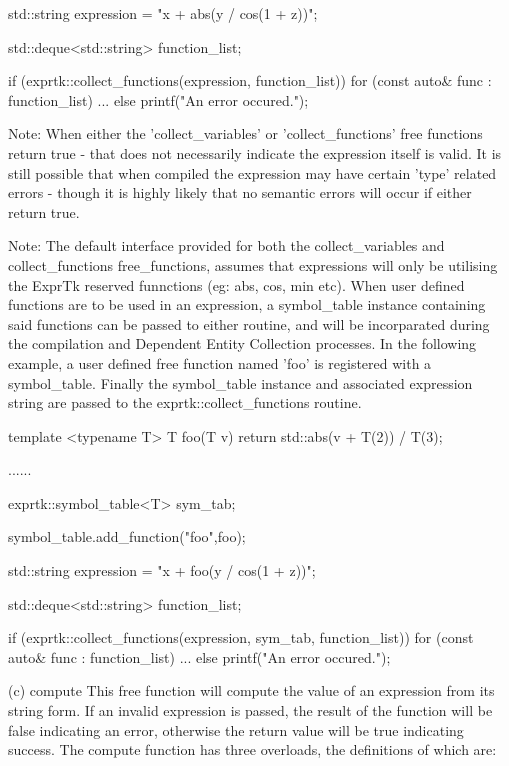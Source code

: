 {std::string expression = "x + abs(y / cos(1 + z))";

std::deque<std::string> function\_list;

if (exprtk::collect\_functions(expression, function\_list))
{
	for (const auto\& func : function\_list)
	{
		...
	}
}
else
printf("An error occured.");


Note: When either the 'collect\_variables'  or 'collect\_functions' free
functions  return  true  -  that  does  not  necessarily  indicate the
expression itself is  valid. It is  still possible that  when compiled
the expression may have certain  'type' related errors - though  it is
highly likely  that no  semantic errors  will occur  if either  return
true.

Note: The  default interface  provided for  both the collect\_variables
and collect\_functions  free\_functions, assumes  that expressions  will
only be utilising  the ExprTk reserved  funnctions (eg: abs,  cos, min
etc). When user defined functions are  to be used in an expression,  a
symbol\_table  instance  containing  said functions  can  be  passed to
either routine, and  will be incorparated  during the compilation  and
Dependent Entity  Collection processes.  In the  following example,  a
user  defined  free  function   named  'foo'  is  registered   with  a
symbol\_table.  Finally  the   symbol\_table  instance  and   associated
expression string are passed to the exprtk::collect\_functions routine.

template <typename T>
T foo(T v)
{
	return std::abs(v + T(2)) / T(3);
}

......

exprtk::symbol\_table<T> sym\_tab;

symbol\_table.add\_function("foo",foo);

std::string expression = "x + foo(y / cos(1 + z))";

std::deque<std::string> function\_list;

if (exprtk::collect\_functions(expression, sym\_tab, function\_list))
{
	for (const auto\& func : function\_list)
	{
		...
	}
}
else
printf("An error occured.");


(c) compute
This free function  will compute the  value of an  expression from its
string form.  If an  invalid expression  is passed,  the result of the
function will be false indicating an error, otherwise the return value
will  be  true  indicating success.  The  compute  function has  three
overloads, the definitions of which are:

}
